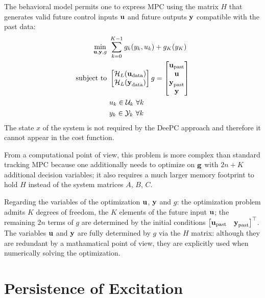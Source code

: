 The behavioral model permits one to express MPC using the matrix $H$ that generates valid future control inputs $\boldsymbol{\mathrm{u}}$ and future outputs $\boldsymbol{\mathrm{y}}$ compatible with the past data:
\begin{equation*}
  \begin{aligned}
    \min_{\boldsymbol{\mathrm{u}}, \boldsymbol{\mathrm{y}},g}\ & \sum_{k=0}^{K-1} g_k(y_k,u_k) + g_K(y_K) \\
    \textrm{subject to } & \begin{bmatrix}
                             \mathcal{H}_L(\boldsymbol{\mathrm{u}}_\textrm{data}) \\ \mathcal{H}_L(\boldsymbol{\mathrm{y}}_\textrm{data})
                           \end{bmatrix} g =
                           \begin{bmatrix}
                             \boldsymbol{\mathrm{u}}_\textrm{past} \\ \boldsymbol{\mathrm{u}} \\ \boldsymbol{\mathrm{y}}_\textrm{past} \\ \boldsymbol{\mathrm{y}}
                           \end{bmatrix} \\
                            & u_k \in \mathcal{U}_k\ \forall k \\
                            & y_k \in \mathcal{Y}_k\ \forall k
  \end{aligned}
\end{equation*}
The state $x$ of the system is not required by the DeePC approach and therefore it cannot appear in the cost function.

From a computational point of view, this problem is more complex than standard tracking MPC because one additionally needs to optimize on $\boldsymbol{\mathrm{g}}$ with $2n+K$ additional decision variables; it also requires a much larger memory footprint to hold $H$ instead of the system matrices $A$, $B$, $C$.

Regarding the variables of the optimization $\boldsymbol{\mathrm{u}}$, $\boldsymbol{\mathrm{y}}$ and $g$: the optimization problem admits $K$ degrees of freedom, the $K$ elements of the future input $\boldsymbol{\mathrm{u}}$; the remaining $2n$ terms of $g$ are determined by the initial conditions $
\begin{bmatrix}
  \boldsymbol{\mathrm{u}}_\textrm{past} & \boldsymbol{\mathrm{y}}_\textrm{past}
\end{bmatrix}^\top
$. The variables $\boldsymbol{\mathrm{u}}$ and $\boldsymbol{\mathrm{y}}$ are fully determined by $g$ via the $H$ matrix: although they are redundant by a mathamatical point of view, they are explicitly used when numerically solving the optimization.

\section{Persistence of Excitation}
\label{sec:persistence-excitation}

